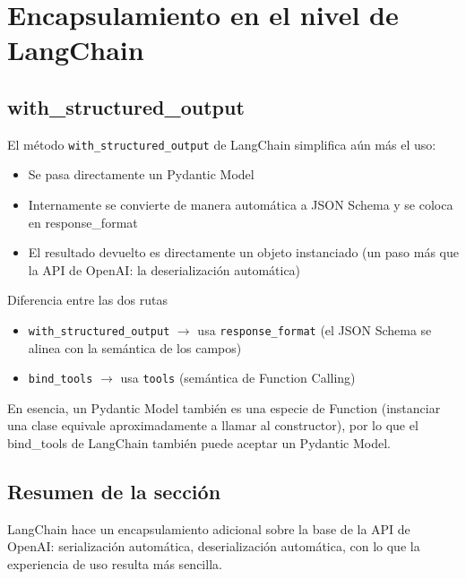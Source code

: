 \section{Encapsulamiento en el nivel de LangChain}

\subsection{with\_structured\_output}

El método \texttt{with\_structured\_output} de LangChain simplifica aún más el uso:

\begin{itemize}
    \item Se pasa directamente un Pydantic Model
    \item Internamente se convierte de manera automática a JSON Schema y se coloca en response\_format
    \item El resultado devuelto es directamente un objeto instanciado (un paso más que la API de OpenAI: la deserialización automática)
\end{itemize}

\begin{warningbox}{Diferencia entre las dos rutas}
\begin{itemize}
    \item \texttt{with\_structured\_output} $\rightarrow$ usa \texttt{response\_format} (el JSON Schema se alinea con la semántica de los campos)
    \item \texttt{bind\_tools} $\rightarrow$ usa \texttt{tools} (semántica de Function Calling)
\end{itemize}
En esencia, un Pydantic Model también es una especie de Function (instanciar una clase equivale aproximadamente a llamar al constructor), por lo que el bind\_tools de LangChain también puede aceptar un Pydantic Model.
\end{warningbox}

\subsection{Resumen de la sección}

LangChain hace un encapsulamiento adicional sobre la base de la API de OpenAI: serialización automática, deserialización automática, con lo que la experiencia de uso resulta más sencilla.

